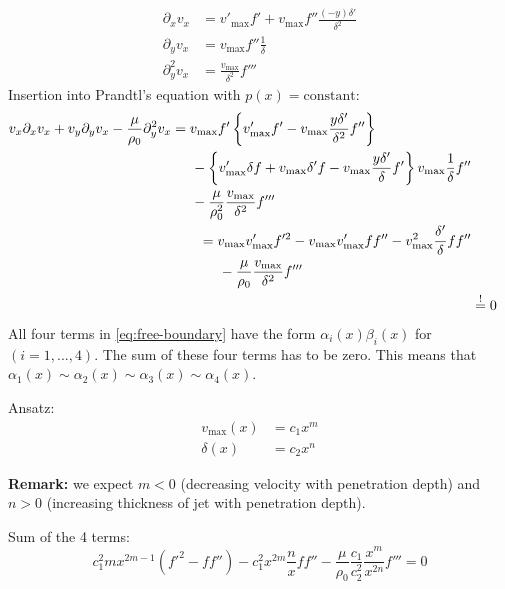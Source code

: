 \begin{align}
\partial_xv_x &= v'_\mathrm{max}f'+v_\mathrm{max}f''\frac{(-y)\delta'}{\delta^2} \\
\partial_yv_x &= v_\mathrm{max} f''\frac{1}{\delta}\\
\partial^2_yv_x &= \frac{v_\mathrm{max}}{\delta^2}f'''
\end{align}
Insertion into Prandtl's equation with $p(x)=\text{constant}$:
\begin{align}
\begin{split}
v_x\partial_x v_x+v_y\partial_yv_x-\frac{\mu}{\rho_0}\partial^2_yv_x &= v_\mathrm{max}f'\left\lbrace v'_\mathrm{max}f' - v_\mathrm{max}\frac{y\delta'}{\delta^2}f''\right\rbrace \\
&\hspace{5mm}-\left\lbrace v'_\mathrm{max}\delta f + v_\mathrm{max}\delta'f-v_\mathrm{max}\frac{y\delta'}{\delta}f'\right\rbrace v_\mathrm{max}\frac{1}{\delta}f'' \\
&\hspace{5mm}-\frac{\mu}{\rho_0^2} \frac{v_\mathrm{max}}{\delta^2}f'''
\end{split}\\
\begin{split}
&= v_\mathrm{max}v'_\mathrm{max}f'^2-v_\mathrm{max}v'_\mathrm{max}ff''-v_\mathrm{max}^2\frac{\delta'}{\delta}ff'' \\
&\hspace{5mm}-\frac{\mu}{\rho_0}\frac{v_\mathrm{max}}{\delta^2}f'''\label{eq:free-boundary}
\end{split} \\
&\overset{!}{=}0 \label{eq:prandtl}
\end{align}
All four terms in \eqref{eq:free-boundary} have the form $\alpha_i(x)\beta_i(x)$ for $(i=1,...,4)$. The sum of these four terms has to be zero. This means that $\alpha_1(x)\sim\alpha_2(x)\sim\alpha_3(x)\sim\alpha_4(x)$.

Ansatz:
\begin{align}
v_\mathrm{max}(x) &= c_1x^m\\
\delta(x) &= c_2 x^n
\end{align}

\begin{framed}
\textbf{Remark:} we expect $m<0$ (decreasing velocity with penetration depth) and $n>0$ (increasing thickness of jet with penetration depth).
\end{framed}

Sum of the 4 terms:
\begin{equation}
c_1^2mx^{2m-1}(f'^2-ff'')-c_1^2x^{2m}\frac{n}{x}ff'' - \frac{\mu}{\rho_0}\frac{c_1}{c_2^2}\frac{x^m}{x^{2n}}f'''=0
\end{equation}

